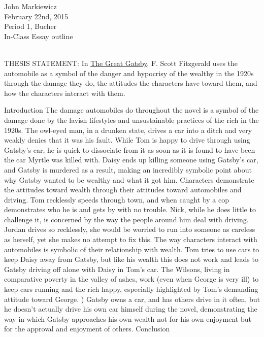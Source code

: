 \documentclass[11pt]{article}
\begin{document}
\begin{raggedleft}
John Markiewicz \\
February 22nd, 2015 \\
Period 1, Bucher \\
In-Class Essay outline \\
\end{raggedleft}
\noindent
\\ THESIS STATEMENT: In \underline{The Great Gatsby}, F. Scott Fitzgerald uses 
the automobile as a symbol of the danger and hypocrisy of the wealthy in the 
1920s through the damage they do, the attitudes the characters have toward 
them, and how the characters interact with them.
\begin{outline}[enumerate]
		\1 Introduction
		\1 The damage automobiles do throughout the novel is a symbol 
	of the damage done by the lavish lifestyles and unsustainable 
practices of the rich in the 1920s.
		\2 The owl-eyed man, in a drunken state, drives a car into a 
	ditch and very weakly denies that it was his fault.
		\2 While Tom is happy to drive through using Gatsby's car, he 
	is quick to dissociate from it as soon as it is found to have been the 
car Myrtle was killed with.
		\2 Daisy ends up killing someone using Gatsby's car, and 
	Gatsby is murdered as a result, making an incredibly symbolic point 
about why Gatsby wanted to be wealthy and what it got him.
	\1 Characters demonstrate the attitudes toward wealth through their 
attitudes toward automobiles and driving.
		\2 Tom recklessly speeds through town, and when caught by a 
	cop demonstrates who he is and gets by with no trouble.
		\2 Nick, while he does little to challenge it, is concerned by 
	the way the people around him deal with driving.
		\2 Jordan drives so recklessly, she would be worried to run 
	into someone as careless as herself, yet she makes no attempt to fix this.
	\1 The way characters interact with automobiles is symbolic of their 
relationship with wealth.
		\2 Tom tries to use cars to keep Daisy away from Gatsby, but 
	like his wealth this does not work and leads to Gatsby driving off 
alone with Daisy in Tom's car.
		\2 The Wilsons, living in comparative poverty in the valley of 
	ashes, work (even when George is very ill) to keep cars running and 
the rich happy, especially highlighted by Tom's demanding attitude toward George.
)	\2 Gatsby owns a car, and has others drive in it often, but he doesn't 
actually drive his own car himself during the novel, demonstrating the way in 
which Gatsby approaches his own wealth not for his own enjoyment but for the 
approval and enjoyment of others.
	\1 Conclusion
\end{outline}
\end{document}
